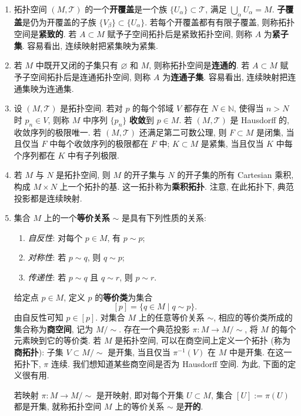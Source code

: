 \begin{enumerate}[label=(\arabic*),leftmargin=*]
\item 拓扑空间 $(M,\mathcal{T})$ 的一个\textbf{开覆盖}是一个族 $\{U_\alpha\}\subset\mathcal{T}$, 满足 $\bigcup_\alpha U_\alpha=M$. \textbf{子覆盖}是仍为开覆盖的子族 $\{V_\beta\}\subset\{U_\alpha\}$. 若每个开覆盖都有有限子覆盖, 则称拓扑空间是\textbf{紧致的}. 若 $A\subset M$ 赋予子空间拓扑后是紧致拓扑空间, 则称 $A$ 为\textbf{紧子集}. 容易看出, 连续映射把紧集映为紧集.
\item 若 $M$ 中既开又闭的子集只有 $\varnothing$ 和 $M$, 则称拓扑空间是\textbf{连通的}. 若 $A\subset M$ 赋予子空间拓扑后是连通拓扑空间, 则称 $A$ 为\textbf{连通子集}. 容易看出, 连续映射把连通集映为连通集.
\item 设 $(M,\mathcal{T})$ 是拓扑空间. 若对 $p$ 的每个邻域 $V$ 都存在 $N\in\mathbb{N}$, 使得当 $n>N$ 时 $p_n\in V$, 则称 $M$ 中序列 $\{p_n\}$ \textbf{收敛}到 $p\in M$. 若 $(M,\mathcal{T})$ 是 Hausdorff 的, 收敛序列的极限唯一. 若 $(M,\mathcal{T})$ 还满足第二可数公理, 则 $F\subset M$ 是闭集, 当且仅当 $F$ 中每个收敛序列的极限都在 $F$ 中; $K\subset M$ 是紧集, 当且仅当 $K$ 中每个序列都在 $K$ 中有子列极限.
\item 若 $M$ 与 $N$ 是拓扑空间, 则 $M$ 的开子集与 $N$ 的开子集的所有 Cartesian 乘积, \label{idx:basis-for-product-topology}构成 $M\times N$ 上一个拓扑的基. 这一拓扑称为\textbf{乘积拓扑}. 注意, 在此拓扑下, 典范投影都是连续映射.
\item 集合 $M$ 上的一个\textbf{等价关系} $\sim$ 是具有下列性质的关系:
\begin{enumerate}[label=(\roman*),leftmargin=*]
\item \emph{自反性}: 对每个 $p\in M$, 有 $p\sim p$;
\item \emph{对称性}: 若 $p\sim q$, 则 $q\sim p$;
\item \emph{传递性}: 若 $p\sim q$ 且 $q\sim r$, 则 $p\sim r$.
\end{enumerate}
给定点 $p\in M$, 定义 $p$ 的\textbf{等价类}为集合
\[
  [p]=\{q\in M\mid q\sim p\}.
\]
由自反性可知 $p\in[p]$. 对集合 $M$ 上的任意等价关系 $\sim$, 相应的等价类所成的集合称为\textbf{商空间}, 记为 $M/{\sim}$. 存在一个典范投影 $\pi:M\to M/{\sim}$, 将 $M$ 的每个元素映到它的等价类. 若 $M$ 是拓扑空间, 可以在商空间上定义一个拓扑 (称为\textbf{商拓扑}): 子集 $V\subset M/{\sim}$ 是开集, 当且仅当 $\pi^{-1}(V)$ 在 $M$ 中是开集. 在这一拓扑下, $\pi$ 连续. 我们想知道某些商空间是否为 Hausdorff 空间. 为此, 下面的定义很有用.

\begin{RiemannDefinition}\label{def:open-equivalence-relation}
若映射 $\pi:M\to M/{\sim}$ 是开映射, 即对每个开集 $U\subset M$, 集合 $[U]:=\pi(U)$ 都是开集, 就称拓扑空间 $M$ 上的等价关系 $\sim$ 是\textbf{开的}.
\end{RiemannDefinition}


\end{enumerate}
